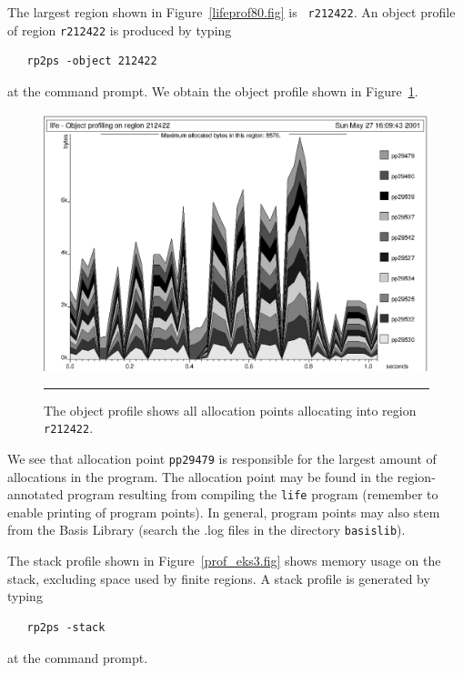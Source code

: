 \documentclass[12pt]{book}
\begin{document}
The largest region shown in Figure~\ref{lifeprof80.fig} is {\tt
  r212422}. An
%
%
object profile of region {\tt r212422} is produced by typing
\begin{verbatim}
   rp2ps -object 212422
\end{verbatim}
at the command prompt. We obtain the object profile shown in
Figure~\ref{prof_eks2.fig}.
\begin{figure}
\begin{center}
\includegraphics{prof_eks2.ps}
\end{center}
\caption{The object profile shows all allocation points allocating into region {\tt r212422}.}
\label{prof_eks2.fig}
\medskip\hrule
\end{figure}

We see that allocation point \texttt{pp29479} is responsible for the
largest amount of allocations in the program. The allocation point may
be found in the region-annotated program resulting from compiling the
{\tt life} program (remember to enable printing of program points). In
general, program points may also stem from the Basis Library (search
the {.log} files in the directory {\tt basislib}).

The stack profile shown in Figure~\ref{prof_eks3.fig} shows memory
usage on the stack, excluding space used by finite regions. A 
%
%
stack profile is generated by typing
\begin{verbatim}
   rp2ps -stack
\end{verbatim}
at the command prompt.
\end{document}
